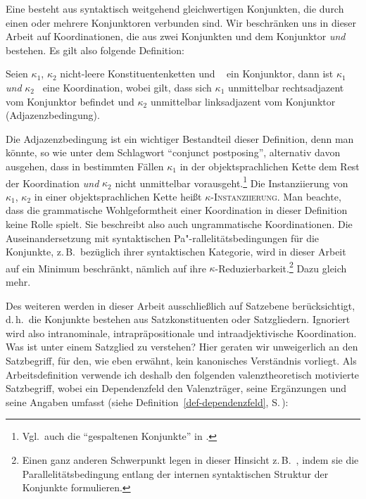 Eine  besteht aus syntaktisch weitgehend gleichwertigen Konjunkten, die durch einen oder mehrere Konjunktoren verbunden sind.  Wir beschränken uns in dieser Arbeit auf Koordinationen, die aus zwei Konjunkten und dem Konjunktor {\it und} bestehen. Es gilt also folgende Definition:
\begin{definition}[Koordination] 
Seien $\kappa_1$, $\kappa_2$ nicht-leere Konstituentenketten und \linebreak {}\grq~ ein Konjunktor, dann ist \glq$\kappa_1$ {\it und} $\kappa_2$\!\grq~ eine Koordination, wobei gilt, dass sich $\kappa_1$ unmittelbar rechtsadjazent vom Konjunktor befindet und $\kappa_2$ unmittelbar linksadjazent vom Konjunktor (Adjazenzbedingung). 
\end{definition}
Die Adjazenzbedingung ist ein wichtiger Bestandteil dieser Definition, denn man könnte, so wie \citet[546ff]{Hudson:76} unter dem Schlagwort "`conjunct postposing"', alternativ davon ausgehen, dass in bestimmten Fällen $\kappa_1$ in der objektsprachlichen Kette dem Rest der Koordination {\it und} $\kappa_2$ nicht unmittelbar vorausgeht.\footnote{Vgl.\ auch die "`gespaltenen Konjunkte"' in \cite{Hoehle:83}.} Die Instanziierung von $\kappa_1$, $\kappa_2$ in einer objektsprachlichen Kette hei\ss t \textsc{$\kappa$-Instanziierung}. Man beachte, dass die grammatische Wohlgeformtheit einer Koordination in dieser Definition keine Rolle spielt. Sie beschreibt also auch ungrammatische Koordinationen. Die Auseinandersetzung mit syntaktischen Pa"-rallelitätsbedingungen für die Konjunkte, z.\,B.\  bezüglich ihrer syntaktischen Kategorie, wird in dieser Arbeit auf ein Minimum beschränkt, nämlich auf ihre $\kappa$-Reduzierbarkeit.\footnote{Einen ganz anderen Schwerpunkt legen in dieser Hinsicht z.\,B.\ \cite{Sag:etal:85}, indem sie die Parallelitätsbedingung entlang der internen syntaktischen Struktur der Konjunkte formulieren.} Dazu gleich mehr. 

Des weiteren werden in dieser Arbeit ausschlie\ss lich  auf Satzebene berücksichtigt, d.\,h.\ die Konjunkte bestehen aus Satzkonstituenten oder Satzgliedern. Ignoriert wird also intranominale, intrapräpositionale und intraadjektivische Koordination. Was ist unter einem Satzglied zu verstehen? Hier geraten wir unweigerlich an den Satzbegriff, für den, wie eben erwähnt, kein kanonisches Verständnis vorliegt. Als Arbeitsdefinition verwende ich deshalb den folgenden valenztheoretisch motivierte Satzbegriff, wobei ein Dependenzfeld den Valenzträger, seine Ergänzungen und seine Angaben umfasst (siehe Definition~\ref{def-dependenzfeld}, S.\,\pageref{def-dependenzfeld}):

